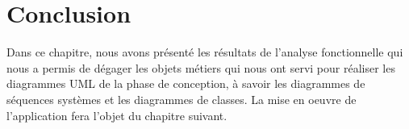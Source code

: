 \section*{Conclusion}
Dans ce chapitre, nous avons présenté les résultats de l’analyse fonctionnelle
qui nous a permis de dégager les objets métiers qui nous ont servi
pour réaliser les diagrammes UML de la phase de conception, à savoir les
diagrammes de séquences systèmes et les diagrammes de classes. La mise
en oeuvre de l’application fera l’objet du chapitre suivant.